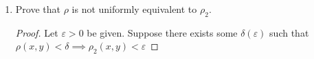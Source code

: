 \documentclass{article}
\begin{document}
\begin{enumerate}
\begin{enumerate}
\begin{proof}
                              Choose $\delta=\frac{\varepsilon}{1+\lvert x-y\rvert}$ and suppose that $\rho_2(x,y)<\delta$.
                              It follows that
                              \begin{align*}
                                    \rho(x, y) & = \frac{\lvert x-y\rvert}{1+\lvert x-y\rvert} \\
                                               & \leq \frac{\lvert x-y\rvert}{1}               \\
                                               & = \lvert x-y\rvert                            \\
                                               & = \rho_2(x, y)                                \\
                                               & < \delta \leq \varepsilon
                              \end{align*}
                              On the other hand, suppose that $\rho(x,y)<\delta$. Then
                              \begin{align*}
                                    \rho_2(x, y) & = \lvert x-y\rvert                                                \\
                                                 & = (1+\lvert x-y\rvert)\frac{\lvert x-y\rvert}{1+\lvert x-y\rvert} \\
                                                 & = (1+\lvert x-y\rvert)\rho(x,y)                                   \\
                                                 & < (1+\lvert x-y\rvert)\delta                                      \\
                                                 & = (1+\lvert x-y\rvert)\frac{\varepsilon}{1+\lvert x-y\rvert}      \\
                                                 & = \varepsilon
                              \end{align*}
                        \end{proof}
                  \item Prove that $\rho$ is not uniformly equivalent to
                        $\rho_2$.
                        \begin{proof}
                              Let $\varepsilon>0$ be given. Suppose there exists
                              some $\delta(\varepsilon)$ such that
                              $\rho(x,y)<\delta\implies\rho_2(x,y)<\varepsilon$

\end{proof}
\end{enumerate}
\end{enumerate}
\end{document}
